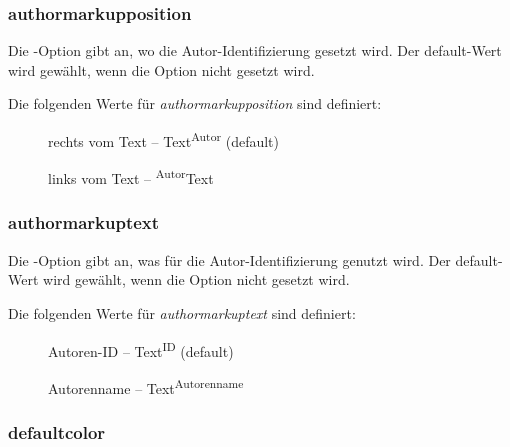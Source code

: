 

\subsubsection{authormarkupposition}


Die -Option gibt an, wo die Autor-Identifizierung gesetzt wird.
Der default-Wert wird gewählt, wenn die Option nicht gesetzt wird.

Die folgenden Werte für \emph{authormarkupposition} sind definiert:

\begin{description}
	\item [] rechts vom Text -- Text\textsuperscript{Autor} (default)
	\item [] links vom Text -- \textsuperscript{Autor}Text
\end{description}



\subsubsection{authormarkuptext}


Die -Option gibt an, was für die Autor-Identifizierung genutzt wird.
Der default-Wert wird gewählt, wenn die Option nicht gesetzt wird.

Die folgenden Werte für \emph{authormarkuptext} sind definiert:

\begin{description}
	\item [] Autoren-ID -- Text\textsuperscript{ID} (default)
	\item [] Autorenname -- Text\textsuperscript{Autorenname}
\end{description}



\subsubsection{defaultcolor}


